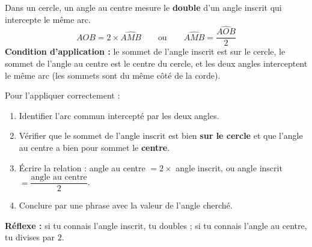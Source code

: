 \documentclass[11pt]{article}
\newcommand{\cle}[1]{{\popxbold\color{popdark}#1}}
\begin{document}
\begin{propriete}
Dans un cercle, un \cle{angle au centre} mesure le \textbf{double} d'un \cle{angle inscrit} qui intercepte le même arc.
\[ \widehat{AOB} = 2 \times \widehat{AMB} \qquad \text{ou} \qquad \widehat{AMB} = \frac{\widehat{AOB}}{2} \]
\textbf{Condition d'application :} le sommet de l'angle inscrit est sur le cercle, le sommet de l'angle au centre est le centre du cercle, et les deux angles interceptent le même arc (les sommets sont du même côté de la corde).
\end{propriete}

\begin{methode}
Pour l'appliquer correctement :
\begin{enumerate}
\item Identifier l'arc commun intercepté par les deux angles.
\item Vérifier que le sommet de l'angle inscrit est bien \textbf{sur le cercle} et que l'angle au centre a bien pour sommet le \textbf{centre}.
\item Écrire la relation : angle au centre $= 2 \times$ angle inscrit, ou angle inscrit $= \dfrac{\text{angle au centre}}{2}$.
\item Conclure par une phrase avec la valeur de l'angle cherché.
\end{enumerate}
\textbf{Réflexe :} si tu connais l'angle inscrit, tu doubles ; si tu connais l'angle au centre, tu divises par $2$.
\end{methode}
\end{document}

